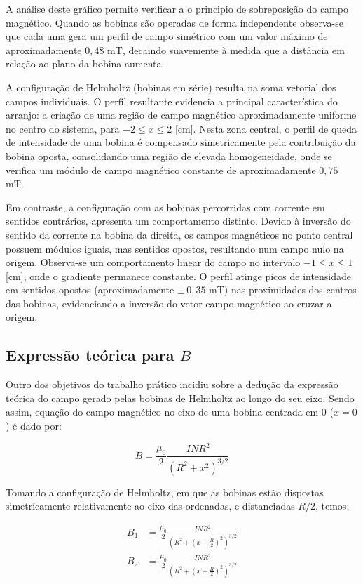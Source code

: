 A análise deste gráfico permite verificar a o principio de sobreposição do campo magnético. Quando as bobinas são operadas de forma independente observa-se que cada uma gera um perfil de campo simétrico com um valor máximo de aproximadamente $0{,}48$ mT, decaindo suavemente à medida que a distância em relação ao plano da bobina aumenta.

A configuração de Helmholtz (bobinas em série) resulta na soma vetorial dos campos individuais. O perfil resultante evidencia a principal característica do arranjo: a criação de uma região de campo magnético aproximadamente uniforme no centro do sistema, para $ -2 \leq x \leq 2$ [cm]. Nesta zona central, o perfil de queda de intensidade de uma bobina é compensado simetricamente pela contribuição da bobina oposta, consolidando uma região de elevada homogeneidade, onde se verifica um módulo de campo magnético constante de aproximadamente $0{,}75$ mT.

Em contraste, a configuração com as bobinas percorridas com corrente em sentidos contrários, apresenta um comportamento distinto. Devido à inversão do sentido da corrente na bobina da direita, os campos magnéticos no ponto central possuem módulos iguais, mas sentidos opostos, resultando num campo nulo na origem. Observa-se um comportamento linear do campo no intervalo $ -1 \leq x \leq 1 $ [cm], onde o gradiente permanece constante. O perfil atinge picos de intensidade em sentidos opostos (aproximadamente $\pm \, 0{,}35$ mT) nas proximidades dos centros das bobinas, evidenciando a inversão do vetor campo magnético ao cruzar a origem.

\subsection{Expressão teórica para $B$}
Outro dos objetivos do trabalho prático incidiu sobre a dedução da expressão teórica do campo gerado pelas bobinas de Helmholtz ao longo do seu eixo.
Sendo assim, equação do campo magnético no eixo de uma bobina centrada em 0 ($x = 0$) é dado por:

\begin{equation*}
	B = \frac{\mu_0}{2}\frac{I N R^2}{(R^2 + x^2)^{3/2}}
\end{equation*}

Tomando a configuração de Helmholtz, em que as bobinas estão dispostas simetricamente relativamente ao eixo das ordenadas, e distanciadas $R/2$, temos:

\begin{align*}
	B_1 & = \frac{\mu_0}{2}\frac{I N R^2}{(R^2 + (x-\frac{R}{2})^2)^{3/2}} \\
	B_2 & = \frac{\mu_0}{2}\frac{I N R^2}{(R^2 + (x+\frac{R}{2})^2)^{3/2}}
\end{align*}

